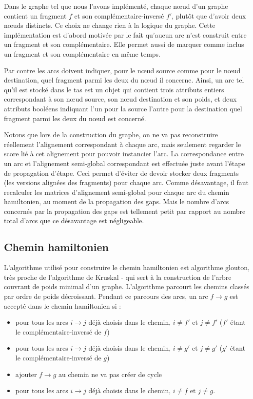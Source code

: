 \documentclass{article}
\begin{document}
Dans le graphe tel que nous l'avons implémenté, chaque nœud d'un graphe contient un fragment $f$ et son complémentaire-inversé $f'$, plutôt que d'avoir deux nœuds distincts. Ce choix ne change rien à la logique du graphe. Cette implémentation est d'abord motivée par le fait qu'aucun arc n'est construit entre un fragment et son complémentaire. Elle permet aussi de marquer comme inclus un fragment et son complémentaire en même temps.

Par contre les arcs doivent indiquer, pour le nœud source comme pour le nœud destination, quel fragment parmi les deux du nœud il concerne. Ainsi, un arc tel qu'il est stocké dans le tas est un objet qui contient trois attributs entiers correspondant à son nœud source, son nœud destination et son poids, et deux attributs booléens indiquant l'un pour la source l'autre pour la destination quel fragment parmi les deux du nœud est concerné.

Notons que lors de la construction du graphe, on ne va pas reconstruire réellement l'alignement correspondant à chaque arc, mais seulement regarder le score lié à cet alignement pour pouvoir instancier l'arc. La correspondance entre un arc et l'alignement semi-global correspondant est effectuée juste avant l'étape de propagation d'étape. Ceci permet d'éviter de devoir stocker deux fragments (les versions alignées des fragments) pour chaque arc. 
Comme désavantage, il faut recalculer les matrices d'alignement semi-global pour chaque arc du chemin hamiltonien, au moment de la propagation des gaps. Mais le nombre d'arcs concernés par la propagation des gaps est tellement petit par rapport au nombre total d'arcs que ce désavantage est négligeable.

\subsection{Chemin hamiltonien}

L'algorithme utilisé pour construire le chemin hamiltonien est algorithme glouton, très proche de l'algorithme de Kruskal - qui sert à la construction de l'arbre couvrant de poids minimal d'un graphe. L'algorithme parcourt les chemins classés par ordre de poids décroissant.
Pendant ce parcours des arcs, un arc $f \to g$ est accepté dans le chemin hamiltonien si :

\begin{itemize}
\item pour tous les arcs $i \to j$ déjà choisis dans le chemin, $i \neq f'$ et $j \neq f'$  ($f'$ étant le complémentaire-inversé de $f$)
\item pour tous les arcs $i \to j$ déjà choisis dans le chemin, $i \neq g'$ et $j \neq g'$  ($g'$ étant le complémentaire-inversé de $g$)
\item ajouter $f \to g$ au chemin ne va pas créer de cycle
\item pour tous les arcs $i \to j$ déjà choisis dans le chemin, $i \neq f$ et $j \neq g$.
\end{itemize}
\end{document}
